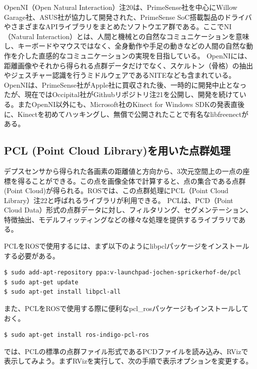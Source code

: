 OpenNI（Open Natural Interaction）注20は、PrimeSense社を中心にWillow Garage社、ASUS社が協力して開発された、PrimeSense SoC搭載製品のドライバやさまざまなAPIライブラリをまとめたソフトウエア群である。ここでNI（Natural Interaction）とは、人間と機械との自然なコミュニケーションを意味し、キーボードやマウスではなく、全身動作や手足の動きなどの人間の自然な動作を介した直感的なコミュニケーションの実現を目指している。
OpenNIには、距離画像やそれから得られる点群データだけでなく、スケルトン（骨格）の抽出やジェスチャー認識を行うミドルウェアであるNITEなども含まれている。OpenNIは、PrimeSense社がApple社に買収された後、一時的に開発中止となったが、現在ではOccipital社がGithubリポジトリ注21を公開し、開発を続けている。またOpenNI以外にも、Microsoft社のKinect for Windows SDKの発表直後に、Kinectを初めてハッキングし、無償で公開されたことで有名なlibfreenectがある。

\subsection{PCL (Point Cloud Library)を用いた点群処理}

デプスセンサから得られた各画素の距離値と方向から、3次元空間上の一点の座標を得ることができる。この点を画像全体で計算すると、点の集合である点群(Point Cloud)が得られる。ROSでは、この点群処理にPCL（Point Cloud Library）注22と呼ばれるライブラリが利用できる。
PCLは、PCD（Point Cloud Data）形式の点群データに対し、フィルタリング、セグメンテーション、特徴抽出、モデルフィッティングなどの様々な処理を提供するライブラリである。

PCLをROSで使用するには、まず以下のようにlibpclパッケージをインストールする必要がある。

\begin{lstlisting}[language=ROS]
$ sudo add-apt-repository ppa:v-launchpad-jochen-sprickerhof-de/pcl
$ sudo apt-get update
$ sudo apt-get install libpcl-all
\end{lstlisting}

また、PCLをROSで使用する際に便利なpcl\_rosパッケージもインストールしておく。

\begin{lstlisting}[language=ROS]
$ sudo apt-get install ros-indigo-pcl-ros
\end{lstlisting}

では、PCLの標準の点群ファイル形式であるPCDファイルを読み込み、RVizで表示してみよう。まずRVizを実行して、次の手順で表示オプションを変更する。

